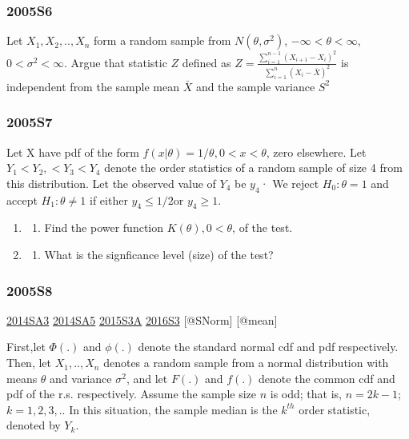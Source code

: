 \documentclass[6pt,Portrait]{article}
\providecommand{\tightlist}{%
  \setlength{\itemsep}{0pt}\setlength{\parskip}{0pt}}
\begin{document}
\hypertarget{s6-1}{%
\subsubsection{2005S6}\label{s6-1}}

Let \(X_1,X_2,..,X_n\) form a random sample from \(N(\theta,\sigma^2)\),
\(-\infty<\theta<\infty\),\(0<\sigma^2<\infty\). Argue that statistic
\(Z\) defined as
\(Z=\frac{\sum_{i=1}^{n-1}(X_{i+1}-X_{i})^2}{\sum_{i=1}^{n}(X_{i}-\bar X)^2}\)
is independent from the sample mean \(\bar X\) and the sample variance
\(S^2\)

\hypertarget{s7-1}{%
\subsubsection{2005S7}\label{s7-1}}

Let X have pdf of the form \(f(x|\theta)=1/\theta, 0<x<\theta\), zero
elsewhere. Let \(Y_1<Y_2,<Y_3<Y_4\) denote the order statistics of a
random sample of size 4 from this distribution. Let the observed value
of \(Y_4\) be \(y_4\)· We reject \(H_0:\theta=1\) and accept
\(H_1:\theta\neq1\) if either \(y_4\le1/2\)or \(y_4\ge1\).

\begin{enumerate}
\def\labelenumi{(\alph{enumi})}
\item
  \begin{enumerate}
  \def\labelenumii{(\arabic{enumii})}
  \setcounter{enumii}{5}
  \tightlist
  \item
    Find the power function \(K(\theta), 0<\theta\), of the test.
  \end{enumerate}
\item
  \begin{enumerate}
  \def\labelenumii{(\arabic{enumii})}
  \setcounter{enumii}{3}
  \tightlist
  \item
    What is the signficance level (size) of the test?
  \end{enumerate}
\end{enumerate}

\hypertarget{s8-1}{%
\subsubsection{2005S8}\label{s8-1}}

\protect\hyperlink{sa3-2}{2014SA3} \protect\hyperlink{sa5-1}{2014SA5}
\protect\hyperlink{s3a-1}{2015S3A} \protect\hyperlink{s3-4}{2016S3}
{[}@SNorm{]} {[}@mean{]}

First,let \(\Phi(.)\) and \(\phi(.)\) denote the standard normal cdf and
pdf respectively. Then, let \(X_1,..,X_n\) denotes a random sample from
a normal distribution with means \(\theta\) and variance \(\sigma^2\),
and let \(F(.)\) and \(f(.)\) denote the common cdf and pdf of the r.s.
respectively. Assume the sample size \(n\) is odd; that is, \(n=2k-1\);
\(k=1,2,3,..\) In this situation, the sample median is the \(k^{th}\)
order statistic, denoted by \(Y_k\).
\end{document}
